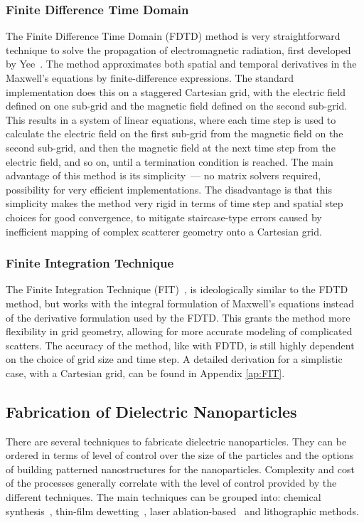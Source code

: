         \subsubsection{Finite Difference Time Domain}
                The Finite Difference Time Domain (FDTD) method is very straightforward technique to solve the propagation of electromagnetic
            radiation, first developed by Yee~\cite{yee1966numerical}. The method approximates both spatial and temporal derivatives in the Maxwell's
            equations by finite-difference expressions. The standard implementation does this on a staggered Cartesian grid, with the electric field
            defined on one sub-grid and the magnetic field defined on the second sub-grid. This results in a system of linear equations, where
            each time step is used to calculate the electric field on the first sub-grid from the magnetic field on the second sub-grid, and then
            the magnetic field at the next time step from the electric field, and so on, until a termination condition is reached.
                The main advantage of this method is its simplicity~--- no matrix solvers required, possibility for very efficient implementations.
            The disadvantage is that this simplicity makes the method very rigid in terms of time step and spatial step choices for good convergence,
            to mitigate staircase-type errors caused by inefficient mapping of complex scatterer geometry onto a Cartesian grid.

        \subsubsection{Finite Integration Technique}
                The Finite Integration Technique (FIT)~\cite{wieland1977discretization}, is ideologically similar to the FDTD method, but works with the
            integral formulation of Maxwell's equations instead of the derivative formulation used by the FDTD. This grants the method more flexibility
            in grid geometry, allowing for more accurate modeling of complicated scatters. The accuracy of the method, like with FDTD,
            is still highly dependent on the choice of grid size and time step.
                A detailed derivation for a simplistic case, with a Cartesian grid, can be found in Appendix \ref{ap:FIT}.

    \subsection{Fabrication of Dielectric Nanoparticles}
            There are several techniques to fabricate dielectric nanoparticles. They can be ordered in terms of level of control over the size
        of the particles and the options of building patterned nanostructures for the nanoparticles. Complexity and cost of the processes generally
        correlate with the level of control provided by the different techniques.
            The main techniques can be grouped into: chemical synthesis~\cite{shi2012new}, thin-film dewetting~\cite{abbarchi2014wafer},
        laser ablation-based~\cite{zywietz2014laser} and lithographic methods.

